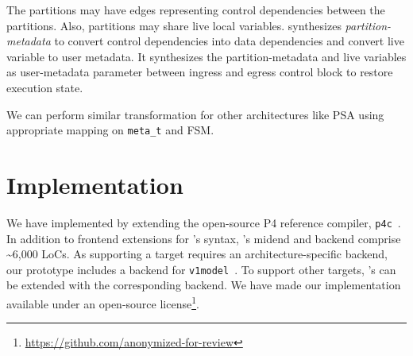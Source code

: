 \documentclass[letterpaper,twocolumn,10pt]{article}
\begin{document}
The partitions may have edges representing control dependencies
between the partitions. Also, partitions may share live local
variables. \ucomp synthesizes \emph{partition-metadata} to convert
control dependencies into data dependencies and convert live variable
to user metadata. It synthesizes the partition-metadata and live
variables as user-metadata parameter between ingress and egress
control block to restore execution state.

We can perform similar transformation for other architectures like 
PSA using appropriate mapping on \texttt{meta\_t} and FSM.











\section{Implementation}
\label{sec:implementation}
We have implemented \ucomp by extending the open-source P4 reference
compiler, \texttt{p4c}~\cite{p4c}. In addition to frontend extensions
for \ulang's syntax, \ucomp's midend and backend comprise
\textasciitilde 6,000 LoCs. As supporting a target requires an
architecture-specific backend, our prototype includes a backend for
\texttt{v1model}~\cite{v1model.p4}. To support other targets, \ucomp's
can be extended with the corresponding backend. We have made our
implementation available under an open-source
license\footnote{\url{https://github.com/anonymized-for-review}}.
\end{document}
